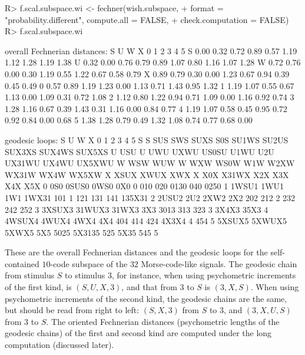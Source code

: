 \documentclass[nojss]{jss}
\begin{document}
\begin{CodeChunk}
\begin{CodeInput}
R> f.scal.subspace.wi <- fechner(wish.subspace,
+    format = "probability.different", compute.all = FALSE,
+    check.computation = FALSE)
R> f.scal.subspace.wi
\end{CodeInput}
\begin{CodeOutput}
overall Fechnerian distances:
     S    U    W    X    0    1    2    3    4    5
S 0.00 0.32 0.72 0.89 0.57 1.19 1.12 1.28 1.19 1.38
U 0.32 0.00 0.76 0.79 0.89 1.07 0.80 1.16 1.07 1.28
W 0.72 0.76 0.00 0.30 1.19 0.55 1.22 0.67 0.58 0.79
X 0.89 0.79 0.30 0.00 1.23 0.67 0.94 0.39 0.45 0.49
0 0.57 0.89 1.19 1.23 0.00 1.13 0.71 1.43 0.95 1.32
1 1.19 1.07 0.55 0.67 1.13 0.00 1.09 0.31 0.72 1.08
2 1.12 0.80 1.22 0.94 0.71 1.09 0.00 1.16 0.92 0.74
3 1.28 1.16 0.67 0.39 1.43 0.31 1.16 0.00 0.84 0.77
4 1.19 1.07 0.58 0.45 0.95 0.72 0.92 0.84 0.00 0.68
5 1.38 1.28 0.79 0.49 1.32 1.08 0.74 0.77 0.68 0.00

geodesic loops:
       S      U     W     X     0      1     2      3      4      5
S      S    SUS   SWS  SUXS   S0S  SU1WS SU2US SUX3XS SUX4WS SUX5XS
U    USU      U   UWU  UXWU US0SU   U1WU   U2U UX31WU  UX4WU UX5XWU
W    WSW    WUW     W   WXW  WS0W    W1W  W2XW  WX31W   WX4W  WX5XW
X   XSUX   XWUX   XWX     X   X0X  X31WX   X2X    X3X    X4X    X5X
0    0S0  0SUS0  0WS0   0X0     0    010   020   0130    040   0250
1  1WSU1   1WU1   1W1 1WX31   101      1   121    131    141 135X31
2  2USU2    2U2  2XW2   2X2   202    212     2    232    242    252
3 3XSUX3 31WUX3 31WX3   3X3  3013    313   323      3  3X4X3   35X3
4 4WSUX4  4WUX4  4WX4   4X4   404    414   424  4X3X4      4    454
5 5XSUX5 5XWUX5 5XWX5   5X5  5025 5X3135   525   5X35    545      5
\end{CodeOutput}
\end{CodeChunk}
These are the overall Fechnerian distances and the geodesic loops for the self-contained $10$-code subspace of the $32$ Morse-code-like signals.
The geodesic chain from stimulus $S$ to stimulus $3$, for instance, when using psychometric increments of the first kind, is $(S,U,X,3)$, 
and that from $3$ to $S$ is
$(3,X,S)$. When using psychometric increments of the second kind, the geodesic chains are the same, but should be read from right to left: 
$(S,X,3)$ from $S$ to $3$, and $(3,X,U,S)$ 
from $3$ to $S$. The oriented Fechnerian distances (psychometric lengths of the geodesic chains) of the first and second kind are computed under 
the long computation (discussed later).
\end{document}
